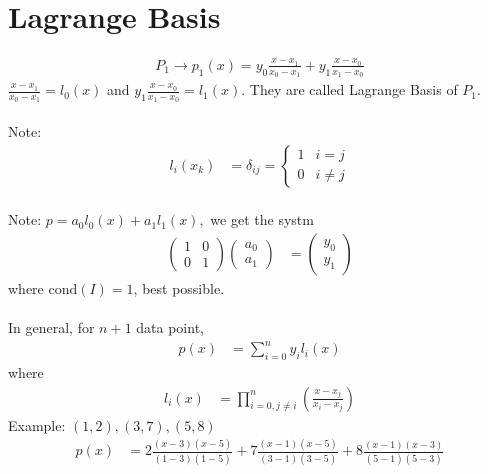 \documentclass[11pt,oneside]{book}
\theoremstyle{break}
\theoremstyle{break}
\newcommand{\note}{\color{red}Note: \color{black}}
\newcommand{\example}{\color{purple}Example: \color{black}}
\begin{document}
\section[Lagrange Basis]{Lagrange Basis}
\begin{align*}
P_1\to p_1(x)=y_0\frac{x-x_1}{x_0-x_1}+y_1\frac{x-x_0}{x_1-x_0}
\end{align*}
$\frac{x-x_1}{x_0-x_1}=l_0(x)$ and $y_1\frac{x-x_0}{x_1-x_0}=l_1(x).$ They are called Lagrange Basis of $P_1$.\\
\hfill\\
\note \begin{align*}
l_i(x_k)&=\delta _{ij}=\begin{cases}1 &i=j\\
0 &i\neq j \end{cases}
\end{align*}\\
\note $p=a_0l_0(x)+a_1l_1(x),$ we get the systm\begin{align*}
\begin{pmatrix}
1&0\\
0&1
\end{pmatrix}\begin{pmatrix}
a_0\\
a_1
\end{pmatrix}&=\begin{pmatrix}
y_0\\
y_1
\end{pmatrix}
\end{align*} 
where $\text{cond}(I)=1$, best possible.\\
\hfill\\
In general, for $n+1$ data point, \begin{align*}
p(x)&=\sum_{i=0}^ny_il_i(x)
\end{align*}
where \begin{align*}
l_i(x)&=\prod _{i=0,j\neq i}^n\left(\frac{x-x_j}{x_i-x_j} \right)
\end{align*}
\example $(1,2),(3,7),(5,8)$\\
\begin{align*}
p(x)&=2\frac{(x-3)(x-5)}{(1-3)(1-5)}+7\frac{(x-1)(x-5)}{(3-1)(3-5)}+8\frac{(x-1)(x-3)}{(5-1)(5-3)}
\end{align*}
\end{document}
